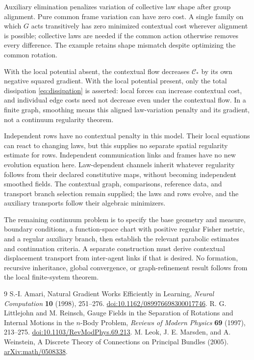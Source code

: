 \documentclass[11pt]{article}
\begin{document}
Auxiliary elimination penalizes variation of collective law shape after group alignment. Pure common frame variation can have zero cost. A single family on which $G$ acts transitively has zero minimized contextual cost wherever alignment is possible; collective laws are needed if the common action otherwise removes every difference. The example retains shape mismatch despite optimizing the common rotation.

With the local potential absent, the contextual flow decreases $\mathcal C_*$ by its own negative squared gradient. With the local potential present, only the total dissipation \eqref{eq:dissipation} is asserted: local forces can increase contextual cost, and individual edge costs need not decrease even under the contextual flow. In a finite graph, smoothing means this aligned law-variation penalty and its gradient, not a continuum regularity theorem.

Independent rows have no contextual penalty in this model. Their local equations can react to changing laws, but this supplies no separate spatial regularity estimate for rows. Independent communication links and frames have no new evolution equation here. Law-dependent channels inherit whatever regularity follows from their declared constitutive maps, without becoming independent smoothed fields. The contextual graph, comparisons, reference data, and transport branch selection remain supplied; the laws and rows evolve, and the auxiliary transports follow their algebraic minimizers.

The remaining continuum problem is to specify the base geometry and measure, boundary conditions, a function-space chart with positive regular Fisher metric, and a regular auxiliary branch, then establish the relevant parabolic estimates and continuation criteria. A separate construction must derive contextual displacement transport from inter-agent links if that is desired. No formation, recursive inheritance, global convergence, or graph-refinement result follows from the local finite-system theorem.

\begin{thebibliography}{9}
S.-I. Amari, Natural Gradient Works Efficiently in Learning,
\emph{Neural Computation} \textbf{10} (1998), 251--276.
\href{https://doi.org/10.1162/089976698300017746}{doi:10.1162/089976698300017746}.
R. G. Littlejohn and M. Reinsch, Gauge Fields in the Separation of Rotations and Internal Motions in the $n$-Body Problem,
\emph{Reviews of Modern Physics} \textbf{69} (1997), 213--275.
\href{https://doi.org/10.1103/RevModPhys.69.213}{doi:10.1103/RevModPhys.69.213}.
M. Leok, J. E. Marsden, and A. Weinstein,
A Discrete Theory of Connections on Principal Bundles (2005).
\href{https://arxiv.org/abs/math/0508338}{arXiv:math/0508338}.
\end{thebibliography}
\end{document}
